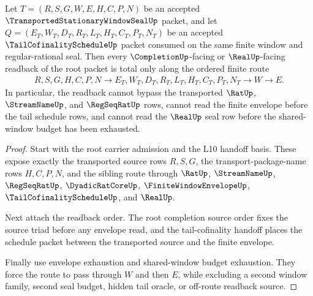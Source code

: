 \begin{theorem}
\label{thm:transported-stationary-window-seal-root-envelope-readback-totality}
Let $T=(R,S,G,W,E,H,C,P,N)$ be an accepted $\TransportedStationaryWindowSealUp$ packet, and let $Q=(E_T,W_T,D_T,R_T,L_T,H_T,C_T,P_T,N_T)$ be an accepted $\TailCofinalityScheduleUp$ packet consumed on the same finite window and regular-rational seal. Then every $\CompletionUp$-facing or $\RealUp$-facing readback of the root packet is total only along the ordered finite route
$$
\begin{aligned}
  R,S,G,H,C,P,N
  \longrightarrow
  E_T,W_T,D_T,R_T,L_T,H_T,C_T,P_T,N_T
  \longrightarrow
  W
  \longrightarrow
  E .
\end{aligned}
$$
In particular, the readback cannot bypass the transported $\RatUp$, $\StreamNameUp$, and $\RegSeqRatUp$ rows, cannot read the finite envelope before the tail schedule rows, and cannot read the $\RealUp$ seal row before the shared-window budget has been exhausted.
\end{theorem}
\begin{proof}
Start with the root carrier admission and the L10 handoff basis. These expose exactly the transported source rows $R,S,G$, the transport-package-name rows $H,C,P,N$, and the sibling route through $\RatUp$, $\StreamNameUp$, $\RegSeqRatUp$, $\DyadicRatCoreUp$, $\FiniteWindowEnvelopeUp$, $\TailCofinalityScheduleUp$, and $\RealUp$.

Next attach the readback order. The root completion source order fixes the source triad before any envelope read, and the tail-cofinality handoff places the schedule packet between the transported source and the finite envelope.

Finally use envelope exhaustion and shared-window budget exhaustion. They force the route to pass through $W$ and then $E$, while excluding a second window family, second seal budget, hidden tail oracle, or off-route readback source.
\end{proof}

